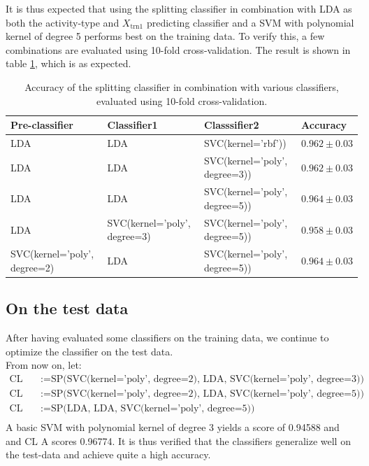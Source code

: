 \documentclass [a4paper] {report}
\begin{document}
	\noindent
	It is thus expected that using the splitting classifier in combination with LDA as both the activity-type and $X_{\text{trn1}}$ predicting classifier and a SVM with polynomial kernel of degree 5 performs best on the training data. To verify this, a few combinations are evaluated using 10-fold cross-validation. The result is shown in table \ref{tab:Xtrn_final}, which is as expected. 
	
	\begin{table}[H]
		\centering
		\caption{Accuracy of the splitting classifier in combination with various classifiers, evaluated using 10-fold cross-validation.}
		\label{tab:Xtrn_final}
		\begin{tabular}{l|l|l|l}
			Pre-classifier 					& Classifier1 					&  Classsifier2								& Accuracy  \\ \hline
			LDA 							& LDA							& SVC(kernel='rbf')) 						& $0.962 \pm 0.03 $\\
			LDA 							& LDA							& SVC(kernel='poly', degree=3)) 			& $0.962 \pm 0.03 $\\
			LDA 							& LDA							& SVC(kernel='poly', degree=5)) 			& $0.964 \pm 0.03 $\\
			LDA 							& SVC(kernel='poly', degree=3)	& SVC(kernel='poly', degree=5)) 			& $0.958 \pm 0.03 $\\
			SVC(kernel='poly', degree=2) 	& LDA							& SVC(kernel='poly', degree=5)) 			& $0.964 \pm 0.03 $\\
		\end{tabular}		
	\end{table}
	
	
	\subsection*{On the test data}
	After having evaluated some classifiers on the training data, we continue to optimize the classifier on the test data. \\
	From now on, let:
	\begin{align*}
		\text{CL A} &:= \text{SP(SVC(kernel='poly', degree=2), LDA, SVC(kernel='poly', degree=3))}\\
		\text{CL B} &:= \text{SP(SVC(kernel='poly', degree=2), LDA, SVC(kernel='poly', degree=5))}\\
		\text{CL C} &:= \text{SP(LDA, LDA, SVC(kernel='poly', degree=5))}\\
	\end{align*}
	A basic SVM with polynomial kernel of degree 3 yields a score of 0.94588 and and $\text{CL A}$ scores 0.96774. It is thus verified that the classifiers generalize well on the test-data and achieve quite a high accuracy. \\
	
\end{document}

